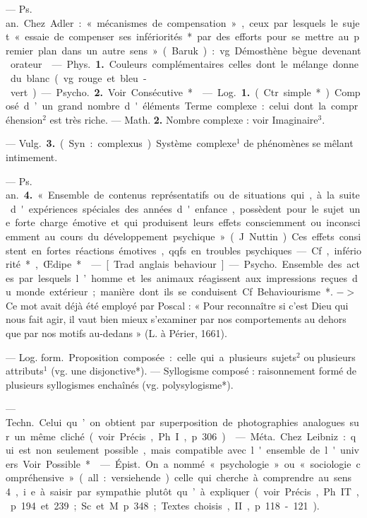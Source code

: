 \begin{itemize}[leftmargin=1cm, label=, itemsep=11pt]
 — \si{Ps. an.} Chez Adler :
« mécanismes de compensation »,
ceux par lesquels le sujet « essaie de
compenser ses infériorités* par des
efforts pour se mettre au premier
plan dans un autre sens » (Baruk) :
vg. Démosthène bègue devenant
orateur.

 — \si{Phys.} {\bf 1.} Couleurs
complémentaires celles dont le
mélange donne du blanc (vg. rouge
et bleu-vert).

— \si{Psycho.} {\bf 2.} Voir Consécutive*.

 — \si{Log.} {\bf 1.} (Ctr.
simple*). Composé d’un grand nombre d'éléments. Terme complexe :
celui dont la compréhension$^2$ est
très riche. — Math. {\bf 2.} Nombre complexe : voir Imaginaire$^3$.

 — \si{Vulg.} {\bf 3.} (Syn. :
complexus). Système complexe$^1$ de
phénomènes se mêlant intimement.

— \si{Ps. an.}  {\bf 4.} « Ensemble de contenus représentatifs ou de situations qui, à la suite d'expériences
spéciales des années d'enfance, possèdent pour le sujet une forte charge
émotive et qui produisent leurs
effets consciemment ou inconsciemment au cours du développement
psychique » (J. Nuttin). Ces effets
consistent en fortes réactions émotives, qqfs. en troubles psychiques.
— Cf, infériorité*, Œdipe*.

 — [Trad. anglais behaviour] — \si{Psycho.} Ensemble des
actes par lesquels l’homme et les
animaux réagissent aux impressions
reçues du monde extérieur; manière
dont ils se conduisent. Cf. Behaviourisme*. $->$ Ce mot avait déjà
été employé par Poscal : « Pour
reconnaître si c'est Dieu qui nous
fait agir, il vaut bien mieux s’examiner par nos comportements au
dehors que par nos motifs au-dedans »
(L. à Périer, 1661).

 — \si{Log. form.} Proposition
composée : celle qui a plusieurs
sujets$^2$ ou plusieurs attributs$^1$ (vg.
une disjonctive*). — Syllogisme
composé : raisonnement formé de
plusieurs syllogismes enchaînés (vg.
polysylogisme*).

 — \si{Techn.} Celui
qu’on obtient par superposition
de photographies analogues sur
un même cliché (voir Précis, Ph. I,
p. 306).

 — \si{Méta.} Chez Leibniz :
qui est non seulement possible,
mais compatible avec l'ensemble de
l'univers. Voir Possible*.

 — \si{Épist.} On a nommé
« psychologie » ou « sociologie compréhensive » (all. : versiehende) celle
qui cherche à comprendre au sens 4,
i. e. à saisir par sympathie plutôt
qu’à expliquer (voir Précis, Ph. IT,
p. 194 et 239; Sc. et M. p. 348;
Textes choisis, II, p. 118-121).


\end{itemize}
